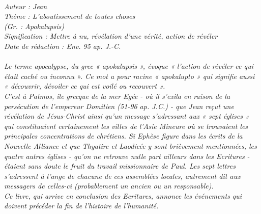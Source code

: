 \BFont
\noindent\hrulefill
{\footnotesize
\textit{
\bigskip
{\centering{}
\\Auteur : Jean
\\Thème : L'aboutissement de toutes choses
\\(Gr. : Apokalupsis)
\\Signification : Mettre à nu, révélation d'une vérité, action de révéler
\\Date de rédaction : Env. 95 ap. J.-C.\\}
}
\textit{
\\Le terme apocalypse, du grec « apokalupsis », évoque « l'action de révéler ce qui était caché ou inconnu ». Ce mot a pour racine « apokalupto » qui signifie aussi « découvrir, dévoiler ce qui est voilé ou recouvert ».
\\C'est à Patmos, île grecque de la mer Egée - où il s'exila en raison de la persécution de l'empereur Domitien (51-96 ap. J.C.) - que Jean reçut une révélation de Jésus-Christ ainsi qu'un message s'adressant aux « sept églises » qui constituaient certainement les villes de l'Asie Mineure où se trouvaient les principales concentrations de chrétiens. Si Ephèse figure dans les écrits de la Nouvelle Alliance et que Thyatire et Laodicée y sont brièvement mentionnées, les quatre autres églises - qu'on ne retrouve nulle part ailleurs dans les Ecritures - étaient sans doute le fruit du travail missionnaire de Paul. Les sept lettres s'adressent à l'ange de chacune de ces assemblées locales, autrement dit aux messagers de celles-ci (probablement un ancien ou un responsable).
\\Ce livre, qui arrive en conclusion des Ecritures, annonce les événements qui doivent précéder la fin de l'histoire de l'humanité.\bigskip
}
}
\par\nobreak\noindent\hrulefill
